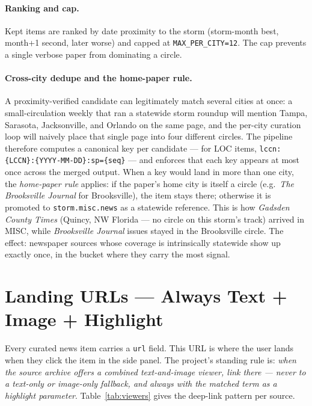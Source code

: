 \documentclass[11pt,letterpaper]{article}
\begin{document}
\paragraph{Ranking and cap.} Kept items are ranked by date proximity to the storm (storm-month best, month+1 second, later worse) and capped at \texttt{MAX\_PER\_CITY=12}. The cap prevents a single verbose paper from dominating a circle.

\paragraph{Cross-city dedupe and the home-paper rule.} A proximity-verified candidate can legitimately match several cities at once: a small-circulation weekly that ran a statewide storm roundup will mention Tampa, Sarasota, Jacksonville, and Orlando on the same page, and the per-city curation loop will naively place that single page into four different circles. The pipeline therefore computes a canonical key per candidate --- for LOC items, \texttt{lccn:\{LCCN\}:\{YYYY-MM-DD\}:sp=\{seq\}} --- and enforces that each key appears at most once across the merged output. When a key would land in more than one city, the \emph{home-paper rule} applies: if the paper's home city is itself a circle (e.g.\ \emph{The Brooksville Journal} for Brooksville), the item stays there; otherwise it is promoted to \texttt{storm.misc.news} as a statewide reference. This is how \emph{Gadsden County Times} (Quincy, NW Florida --- no circle on this storm's track) arrived in MISC, while \emph{Brooksville Journal} issues stayed in the Brooksville circle. The effect: newspaper sources whose coverage is intrinsically statewide show up exactly once, in the bucket where they carry the most signal.

\section{Landing URLs --- Always Text + Image + Highlight}

Every curated news item carries a \texttt{url} field. This URL is where the user lands when they click the item in the side panel. The project's standing rule is: \emph{when the source archive offers a combined text-and-image viewer, link there --- never to a text-only or image-only fallback, and always with the matched term as a highlight parameter}. Table~\ref{tab:viewers} gives the deep-link pattern per source.
\end{document}
